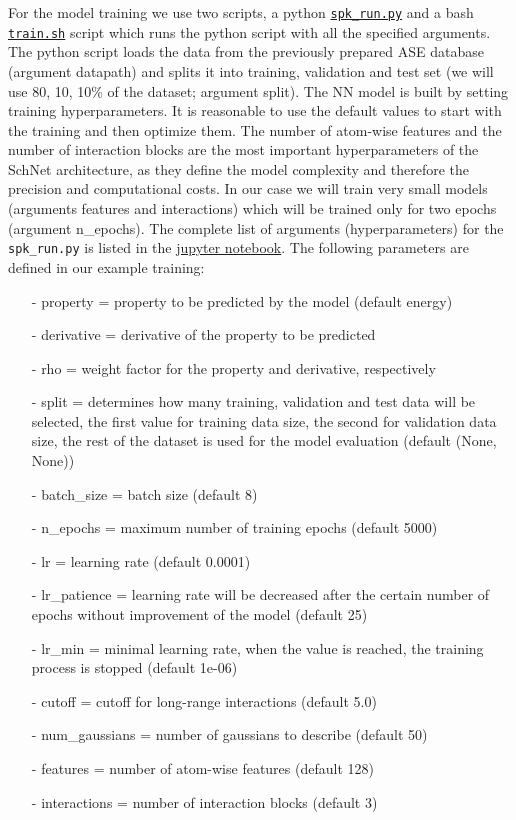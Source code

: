 For the model training we use two scripts, a python \href{https://github.com/LierB/gromos_tutorial_livecoms/blob/burnn_tutorial_rc/tutorial_files/t_06/train_dataset_tutorial/spk_run.py}{\texttt{spk\_run.py}} and a bash \href{https://github.com/LierB/gromos_tutorial_livecoms/blob/burnn_tutorial_rc/tutorial_files/t_06/train_dataset_tutorial/train.sh}{\texttt{train.sh}} script which runs the python script with all the specified arguments. The python script loads the data from the previously prepared ASE database (argument datapath) and splits it into training, validation and test set (we will use 80, 10, 10\% of the dataset; argument split). The NN model is built by setting training hyperparameters. It is reasonable to use the default values to start with the training and then optimize them. The number of atom-wise features and the number of interaction blocks are the most important hyperparameters of the SchNet architecture, as they define the model complexity and therefore the precision and computational costs. In our case we will train very small models (arguments features and interactions) which will be trained only for two epochs (argument n\_epochs). The complete list of arguments (hyperparameters) for the \texttt{spk\_run.py} is listed in the \href{https://github.com/LierB/gromos_tutorial_livecoms/blob/burnn_tutorial_rc/tutorial_files/t_06/train_dataset_tutorial/tutorial_v2.ipynb}{jupyter notebook}. The following parameters are defined in our example training:
\begin{enumerate}
    \item[-] property = property to be predicted by the model (default energy)
    \item[-] derivative = derivative of the property to be predicted
    \item[-] rho = weight factor for the property and derivative, respectively
    \item[-] split = determines how many training, validation and test data will be selected, the first value for training data size, the second for validation data size, the rest of the dataset is used for the model evaluation (default (None, None))
    \item[-] batch\_size = batch size (default 8)
    \item[-] n\_epochs = maximum number of training epochs (default 5000)
    \item[-] lr = learning rate (default 0.0001)
    \item[-] lr\_patience = learning rate will be decreased after the certain number of epochs without improvement of the model (default 25)
    \item[-] lr\_min = minimal learning rate, when the value is reached, the training process is stopped (default 1e-06)
    \item[-] cutoff = cutoff for long-range interactions (default 5.0)
    \item[-] num\_gaussians = number of gaussians to describe (default 50)
    \item[-] features = number of atom-wise features (default 128)
    \item[-] interactions = number of interaction blocks (default 3)
\end{enumerate}

